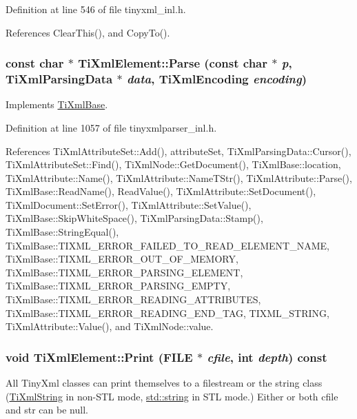 Definition at line 546 of file tinyxml\_\-inl.h.

References ClearThis(), and CopyTo().\hypertarget{class_ti_xml_element_af95c9165159fd9dfdcc5b894a3fcf85b}{
\subsubsection[{Parse}]{\setlength{\rightskip}{0pt plus 5cm}const char $\ast$ TiXmlElement::Parse (const char $\ast$ {\em p}, \/  {\bf TiXmlParsingData} $\ast$ {\em data}, \/  {\bf TiXmlEncoding} {\em encoding})}}
\label{class_ti_xml_element_af95c9165159fd9dfdcc5b894a3fcf85b}


Implements \hyperlink{class_ti_xml_base_a00e4edb0219d00a1379c856e5a1d2025}{TiXmlBase}.

Definition at line 1057 of file tinyxmlparser\_\-inl.h.

References TiXmlAttributeSet::Add(), attributeSet, TiXmlParsingData::Cursor(), TiXmlAttributeSet::Find(), TiXmlNode::GetDocument(), TiXmlBase::location, TiXmlAttribute::Name(), TiXmlAttribute::NameTStr(), TiXmlAttribute::Parse(), TiXmlBase::ReadName(), ReadValue(), TiXmlAttribute::SetDocument(), TiXmlDocument::SetError(), TiXmlAttribute::SetValue(), TiXmlBase::SkipWhiteSpace(), TiXmlParsingData::Stamp(), TiXmlBase::StringEqual(), TiXmlBase::TIXML\_\-ERROR\_\-FAILED\_\-TO\_\-READ\_\-ELEMENT\_\-NAME, TiXmlBase::TIXML\_\-ERROR\_\-OUT\_\-OF\_\-MEMORY, TiXmlBase::TIXML\_\-ERROR\_\-PARSING\_\-ELEMENT, TiXmlBase::TIXML\_\-ERROR\_\-PARSING\_\-EMPTY, TiXmlBase::TIXML\_\-ERROR\_\-READING\_\-ATTRIBUTES, TiXmlBase::TIXML\_\-ERROR\_\-READING\_\-END\_\-TAG, TIXML\_\-STRING, TiXmlAttribute::Value(), and TiXmlNode::value.\hypertarget{class_ti_xml_element_ad9d0c008866982ab8d9aafae7e14d692}{
\subsubsection[{Print}]{\setlength{\rightskip}{0pt plus 5cm}void TiXmlElement::Print (FILE $\ast$ {\em cfile}, \/  int {\em depth}) const}}
\label{class_ti_xml_element_ad9d0c008866982ab8d9aafae7e14d692}
All TinyXml classes can print themselves to a filestream or the string class (\hyperlink{class_ti_xml_string}{TiXmlString} in non-\/STL mode, \hyperlink{classstd_1_1string}{std::string} in STL mode.) Either or both cfile and str can be null.

